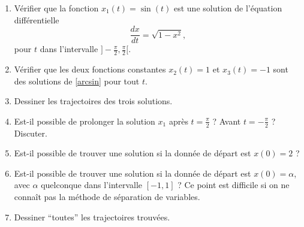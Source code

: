 \begin{exercice}\label{exoTD6A-0002}
 
  \begin{enumerate}
  \item Vérifier que la fonction $x_1(t)=\sin(t)$ est une solution de l'équation différentielle 
    \begin{equation}\label{arcsin}
      \frac{dx}{dt}= \sqrt{1-x^2}, 
    \end{equation} 
    pour $t$ dans l'intervalle $\displaystyle ]-\frac{\pi}{2},\frac{\pi}{2} [$. 
  \item Vérifier que les deux fonctions constantes $x_2(t)= 1$ et $x_3(t)=-1$ sont des solutions de \eqref{arcsin} pour tout $t$.
  \item Dessiner les trajectoires des trois solutions. 
  \item Est-il possible de prolonger la solution $x_1$ après $t=\frac{\pi}{2}$ ? Avant $t=-\frac{\pi}{2}$ ? Discuter. 
  \item Est-il possible de trouver une solution si la donnée de départ est $x(0)= 2$ ? 
  \item Est-il possible de trouver une solution si la donnée de départ est $x(0)= \alpha$, avec $\alpha$ quelconque dans l'intervalle $[-1, 1]$ ? Ce point est difficile si on ne connaît pas la méthode de séparation de variables. 
  \item Dessiner ``toutes'' les trajectoires trouvées.  
  \end{enumerate}
  

\end{exercice}
